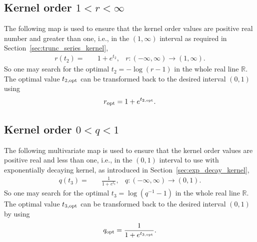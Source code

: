 \documentclass{svjour3}                     %
\newcommand{\reals}{\mathbb{R}}
\newcommand\secref{Section~\ref}
\begin{document}
\subsection{Kernel order $1 < r < \infty$}
The following map is used to ensure that the kernel order values are positive real number and greater than one, i.e., in the $(1, \infty)$ interval as required in \secref{sec:trunc_series_kernel},
\begin{align*}
r(t_2) = & \quad {1 + e^{t_2}}, & r:  (-\infty, \infty) \to (1,\infty).
\end{align*}
So one may search for the optimal $t_2 = -\log(r-1)$ in the whole real line $\reals$.
The optimal value $t_{2, \textup{opt}}$ can be transformed back to the desired interval $(0,1)$ using 
\begin{align*}
r_{\textup{opt}} = 1+ e^{t_{2, \textup{opt}}}.
\end{align*}





\subsection{Kernel order $0 < q < 1$}
The following multivariate map is used to ensure that the kernel order values are positive real and less than one, i.e., in the $(0,1)$ interval to use with exponentially decaying kernel, as introduced in \secref{sec:exp_decay_kernel},
\begin{align*}
q(t_3) = & \quad \frac{1}{1 + e^{t_3}}, & q: (-\infty, \infty) \to (0, 1).
\end{align*}
So one may search for the optimal $t_3 = \log(q^{-1}-1)$ in the whole real line $\reals$.
The optimal value $t_{3, \textup{opt}}$ can be transformed back to the desired interval $(0,1)$ by using
\begin{align*}
q_{\textup{opt}} = \frac{1}{1 + e^{t_{3, \textup{opt}}}}.
\end{align*}
\end{document}
